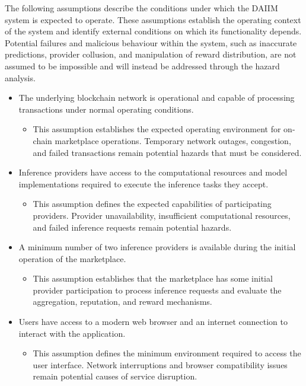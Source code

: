 \documentclass{article}
\begin{document}
The following assumptions describe the conditions under which the DAIIM system is expected to operate. These assumptions establish the operating context of the system and identify external conditions on which its functionality depends. Potential failures and malicious behaviour within the system, such as inaccurate predictions, provider collusion, and manipulation of reward distribution, are not assumed to be impossible and will instead be addressed through the hazard analysis.
\begin{itemize}
\item The underlying blockchain network is operational and capable of processing transactions under normal operating conditions.
\begin{itemize}
\item This assumption establishes the expected operating environment for on-chain marketplace operations. Temporary network outages, congestion, and failed transactions remain potential hazards that must be considered.
\end{itemize}
\item Inference providers have access to the computational resources and model implementations required to execute the inference tasks they accept.
\begin{itemize}
\item This assumption defines the expected capabilities of participating providers. Provider unavailability, insufficient computational resources, and failed inference requests remain potential hazards.
\end{itemize}

\item A minimum number of two inference providers is available during the initial operation of the marketplace.
\begin{itemize}
    \item This assumption establishes that the marketplace has some initial provider participation to process inference requests and evaluate the aggregation, reputation, and reward mechanisms. 
\end{itemize}

\item Users have access to a modern web browser and an internet connection to interact with the application.
\begin{itemize}
    \item This assumption defines the minimum environment required to access the user interface. Network interruptions and browser compatibility issues remain potential causes of service disruption.
\end{itemize}

\end{itemize}
\end{document}
